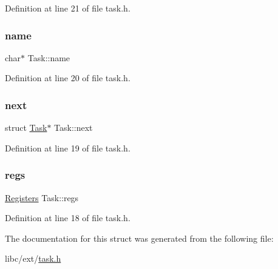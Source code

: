 Definition at line 21 of file task.\+h.

\mbox{\label{a00151_a9cf84d1792cda878178fd3691e472b97_a9cf84d1792cda878178fd3691e472b97}} 
\subsubsection{\texorpdfstring{name}{name}}
{\footnotesize\ttfamily char$\ast$ Task\+::name}



Definition at line 20 of file task.\+h.

\mbox{\label{a00151_a8b6b50960a19f7bae344ef0cc8ec4e7d_a8b6b50960a19f7bae344ef0cc8ec4e7d}} 
\subsubsection{\texorpdfstring{next}{next}}
{\footnotesize\ttfamily struct \hyperlink{a00151}{Task}$\ast$ Task\+::next}



Definition at line 19 of file task.\+h.

\mbox{\label{a00151_a136b243ee52ff89e9ba97f4e4dba19bb_a136b243ee52ff89e9ba97f4e4dba19bb}} 
\subsubsection{\texorpdfstring{regs}{regs}}
{\footnotesize\ttfamily \hyperlink{a00147}{Registers} Task\+::regs}



Definition at line 18 of file task.\+h.



The documentation for this struct was generated from the following file\+:\begin{DoxyCompactItemize}
\item 
libc/ext/\hyperlink{a00059}{task.\+h}\end{DoxyCompactItemize}
